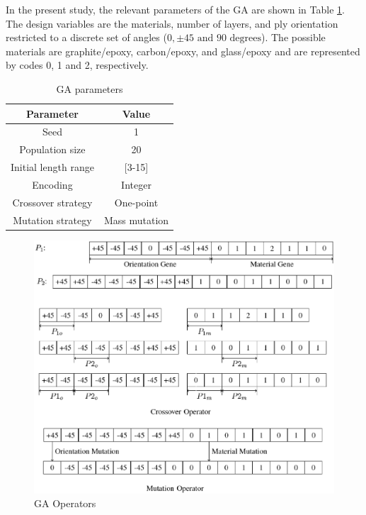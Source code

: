 \documentclass[USenglish,twocolumn]{article}
\begin{document}
In the present study, the relevant parameters of the GA are shown in Table \ref{tab:ga}. The design
variables are the materials, number of layers, and ply orientation restricted to a discrete set of
angles ($0,\pm 45 \text{ and } 90 \text{ degrees} $). The possible materials are graphite/epoxy,
carbon/epoxy, and glass/epoxy and are represented by codes 0, 1 and 2, respectively.


\begin{table}[h]
\centering
\caption{GA parameters}
\begin{adjustbox}{width=0.45\textwidth}
\label{tab:ga}
\begin{tabular}{cc}
\toprule
Parameter				&  Value  \\
\midrule
Seed					& 1       \\
Population size			& 20      \\
Initial length range	& [3-15]  \\
Encoding				& Integer  \\
Crossover strategy		& One-point \\
Mutation strategy		& Mass mutation \\
\bottomrule
\end{tabular}
\end{adjustbox}
\end{table}

\begin{figure}[!hbt]
  \includegraphics[width=\linewidth]{ga_operator}
\caption{GA Operators\label{GA:operator}}
\end{figure}
\end{document}
